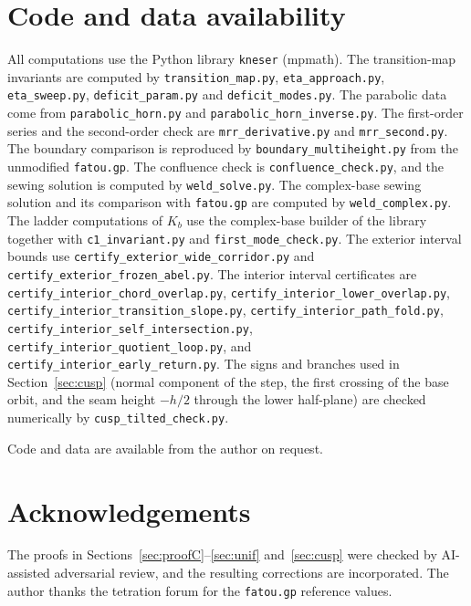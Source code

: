 \documentclass[11pt]{amsart}
\theoremstyle{definition}
\newcommand{\Kk}{K}
\begin{document}
\section*{Code and data availability}
{\small
All computations use the Python library \nolinkurl{kneser} (mpmath).  The
transition-map invariants are computed by \nolinkurl{transition_map.py},
\nolinkurl{eta_approach.py}, \nolinkurl{eta_sweep.py}, \nolinkurl{deficit_param.py} and
\nolinkurl{deficit_modes.py}.  The parabolic data come from
\nolinkurl{parabolic_horn.py} and \nolinkurl{parabolic_horn_inverse.py}.  The
first-order series and the second-order check are \nolinkurl{mrr_derivative.py}
and \nolinkurl{mrr_second.py}.  The boundary comparison is reproduced by
\nolinkurl{boundary_multiheight.py} from the unmodified \nolinkurl{fatou.gp}.
The confluence check is \nolinkurl{confluence_check.py}, and the sewing solution is
computed by \nolinkurl{weld_solve.py}.  The complex-base sewing solution and its comparison with \nolinkurl{fatou.gp} are
computed by \nolinkurl{weld_complex.py}.  The ladder computations of $\Kk_b$ use the
complex-base builder of the library together with \nolinkurl{c1_invariant.py} and
\nolinkurl{first_mode_check.py}.  The exterior interval bounds use
\nolinkurl{certify_exterior_wide_corridor.py} and
\nolinkurl{certify_exterior_frozen_abel.py}.  The interior interval
certificates are \nolinkurl{certify_interior_chord_overlap.py},
\nolinkurl{certify_interior_lower_overlap.py},
\nolinkurl{certify_interior_transition_slope.py},
\nolinkurl{certify_interior_path_fold.py},
\nolinkurl{certify_interior_self_intersection.py},
\nolinkurl{certify_interior_quotient_loop.py}, and
\nolinkurl{certify_interior_early_return.py}.  The signs and branches used in
Section~\ref{sec:cusp} (normal component of the step, the first crossing of
the base orbit, and the seam height $-h/2$ through the lower half-plane) are
checked numerically by \nolinkurl{cusp_tilted_check.py}.\par
Code and data are available from the author on request.\par
}

\section*{Acknowledgements}
The proofs in Sections~\ref{sec:proofC}--\ref{sec:unif} and~\ref{sec:cusp} were
checked by AI-assisted adversarial review, and the resulting corrections are
incorporated.
The author thanks the tetration forum for the \texttt{fatou.gp} reference values.
\end{document}
